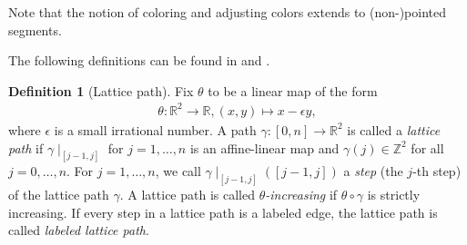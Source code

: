 \documentclass[11pt,reqno,a4]{amsart}
\theoremstyle{dotless}
\theoremstyle{definition}
\newtheorem{definition}[corollary]{Definition}
\begin{document}
Note that the notion of coloring and adjusting colors extends to (non-)pointed segments.

The following definitions can be found in \cite{MikhalkinLatticePaths} and \cite{rag-rug}.


\begin{definition}[Lattice path]\label{definition:lattice_path}
Fix $\theta$ to be a linear map of the form
\begin{align*}
\theta:\mathbb{R}^2\to\mathbb{R}, \left(x,y\right)\mapsto x-\epsilon y,
\end{align*}
where $\epsilon$ is a small irrational number. A path $\gamma:\left[ 0,n\right]\to\mathbb{R}^2$ is called a \textit{lattice path} if $\gamma\mid_{[j-1,j]}$ for $j=1,\dots,n$ is an affine-linear map and $\gamma(j)\in\mathbb{Z}^2$ for all $j=0,\dots,n$. For $j=1,\dots,n$, we call $\gamma\mid_{[j-1,j]}\left([j-1,j] \right)$ a \textit{step} (the $j$-th step) of the lattice path $\gamma$. A lattice path is called \textit{$\theta$-increasing} if $\theta\circ\gamma$ is strictly increasing. If every step in a lattice path is a labeled edge, the lattice path is called \textit{labeled lattice path}.
\end{definition}
\end{document}
